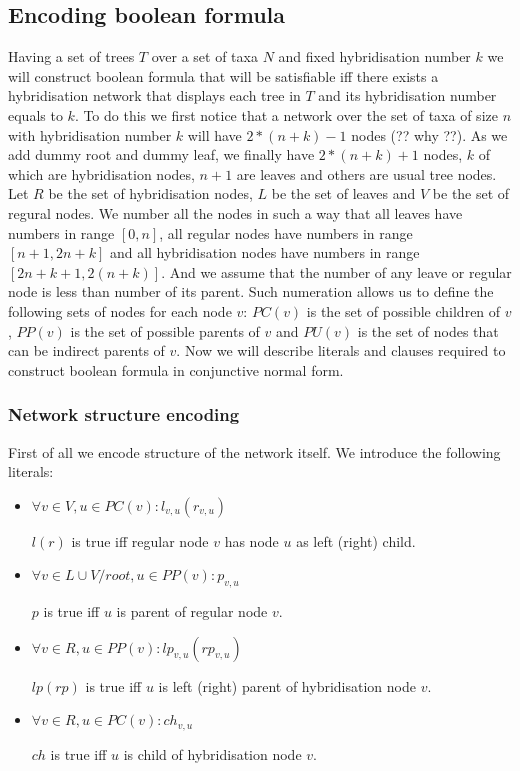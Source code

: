 \documentclass[runningheads, envcountsame, a4paper]{llncs}
\begin{document}
\subsection{Encoding boolean formula}

Having a set of trees $T$ over a set of taxa $N$ and fixed hybridisation number $k$ we will construct boolean formula 
that will be satisfiable iff there exists a hybridisation network that displays each tree in $T$ and its hybridisation 
number equals to $k$. To do this we first notice that a network over the set of taxa of size $n$ with hybridisation number 
$k$ will have $2 * (n + k) - 1$ nodes (?? why ??). As we add dummy root and dummy leaf, we finally have $2 * (n + k) + 1$ nodes, 
$k$ of which are hybridisation nodes, $n + 1$ are leaves and others are usual tree nodes. Let $R$ be the set of hybridisation 
nodes, $L$ be the set of leaves and $V$ be the set of regural nodes. We number all the nodes in such a way that all leaves 
have numbers in range $[0,n]$, all regular nodes have numbers in range $[n + 1,2n + k]$ and all hybridisation nodes have numbers 
in range $[2n + k + 1, 2(n + k)]$. And we assume that the number of any leave or regular node is less than number of its parent. 
Such numeration allows us to define the following sets of nodes for each node $v$: $PC(v)$ is the set of possible children of $v$, 
$PP(v)$ is the set of possible parents of $v$ and $PU(v)$ is the set of nodes that can be indirect parents of $v$. Now we will 
describe literals and clauses required to construct boolean formula in conjunctive normal form.

\subsubsection{Network structure encoding}

First of all we encode structure of the network itself. We introduce the following literals: 

\begin{itemize}

\item $\forall v \in V, u \in PC(v) : l_{v,u}(r_{v,u})$ 

$l (r)$ is true iff regular node $v$ has node $u$ as left (right) child.

\item $\forall v \in L \cup V / root, u \in PP(v) : p_{v,u}$ 

$p$ is true iff $u$ is parent of regular node $v$.

\item $\forall v \in R, u \in PP(v) : lp_{v,u}(rp_{v,u})$ 

$lp (rp)$ is true iff $u$ is left (right) parent of hybridisation node $v$.

\item $\forall v \in R, u \in PC(v) : ch_{v,u}$ 

$ch$ is true iff $u$ is child of hybridisation node $v$.

\end{itemize}
\end{document}
